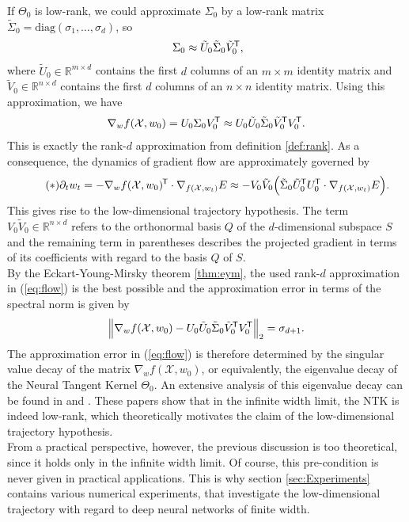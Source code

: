 \documentclass[11pt, a4paper]{article}
\newcommand{\R}{\mathbb{R}}
\newcommand{\X}{\mathcal{X}}
\newcommand*{\tr}{^{\mkern-1.5mu\mathsf{T}}}
\begin{document}
If $\Theta_0$ is low-rank, we could approximate $\Sigma_0$ by a low-rank matrix $\tilde{\Sigma}_0 = \text{diag}(\sigma_1, \dots, \sigma_d)$, so
\[ \Sigma_0 \approx \tilde{U}_0 \tilde{\Sigma}_0 \tilde{V}_0\tr , \]
where $\tilde{U}_0 \in \R^{m \times d}$ contains the first $d$ columns of an $m \times m$ identity matrix and $\tilde{V}_0 \in \R^{n \times d}$ contains the first $d$ columns of an $n \times n$ identity matrix. Using this approximation, we have
\[ \nabla_wf(\X,w_0) = U_0 \Sigma_0 V_0\tr \approx U_0 \tilde{U}_0 \tilde{\Sigma}_0 \tilde{V}_0\tr  V_0\tr . \]
This is exactly the rank-$d$ approximation from definition \ref{def:rank}. As a consequence, the dynamics of gradient flow are approximately governed by
\begin{equation} \label{eq:flow} \tag{$\ast$}
\partial_t w_t = -\nabla_wf(\X,w_0)\tr  \cdot \nabla_{f(\X,w_t)} E \approx - V_0 \tilde{V}_0 \Big ( \tilde{\Sigma}_0 \tilde{U}_0\tr  U_0\tr  \cdot \nabla_{f(\X,w_t)} E \Big ).
\end{equation}
This gives rise to the low-dimensional trajectory hypothesis. The term $V_0\tilde{V}_0 \in \R^{n \times d}$ refers to the orthonormal basis $Q$ of the $d$-dimensional subspace $S$ and the remaining term in parentheses describes the projected gradient in terms of its coefficients with regard to the basis $Q$ of $S$. \\

By the Eckart-Young-Mirsky theorem \ref{thm:eym}, the used rank-$d$ approximation in (\ref{eq:flow}) is the best possible and the approximation error in terms of the spectral norm is given by
\[ \Big \| \nabla_wf(\X,w_0) - U_0 \tilde{U}_0 \tilde{\Sigma}_0 \tilde{V}_0\tr  V_0\tr \Big \|_2 = \sigma_{d+1}. \] 
The approximation error in (\ref{eq:flow}) is therefore determined by the singular value decay of the matrix $\nabla_wf(\X,w_0)$, or equivalently, the eigenvalue decay of the Neural Tangent Kernel $\Theta_0$. An extensive analysis of this eigenvalue decay can be found in \cite{Decay1} and \cite{Decay2}. These papers show that in the infinite width limit, the NTK is indeed low-rank, which theoretically motivates the claim of the low-dimensional trajectory hypothesis. \\

From a practical perspective, however, the previous discussion is too theoretical, since it holds only in the infinite width limit. Of course, this pre-condition is never given in practical applications. This is why section \ref{sec:Experiments} contains various numerical experiments, that investigate the low-dimensional trajectory with regard to deep neural networks of finite width.
\end{document}
